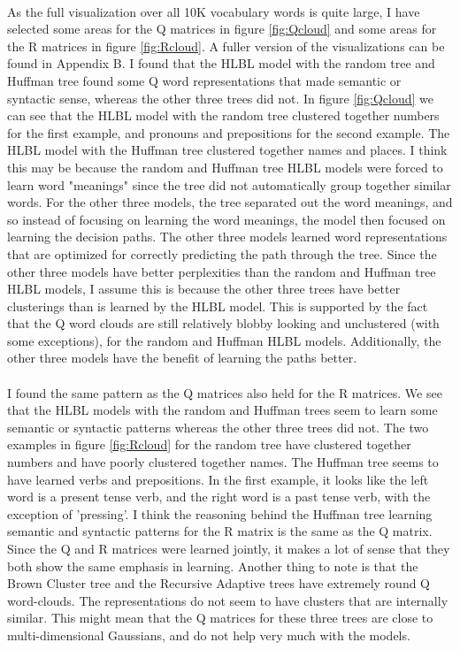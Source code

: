 \documentclass[12pt]{ociamthesis}  %
\begin{document}
\paragraph{}
As the full visualization over all 10K vocabulary words is quite large, I have selected some areas for the Q matrices in figure \ref{fig:Qcloud} and some areas for the R matrices in figure \ref{fig:Rcloud}. A fuller version of the visualizations can be found in Appendix B. I found that the HLBL model with the random tree and Huffman tree found some Q word representations that made semantic or syntactic sense, whereas the other three trees did not. In figure \ref{fig:Qcloud} we can see that the HLBL model with the random tree clustered together numbers for the first example, and pronouns and prepositions for the second example. The HLBL model with the Huffman tree clustered together names and places. I think this may be because the random and Huffman tree HLBL models were forced to learn word "meanings" since the tree did not automatically group together similar words. For the other three models, the tree separated out the word meanings, and so instead of focusing on learning the word meanings, the model then focused on learning the decision paths. The other three models learned word representations that are optimized for correctly predicting the path through the tree. Since the other three models have better perplexities than the random and Huffman tree HLBL models, I assume this is because the other three trees have better clusterings than is learned by the HLBL model. This is supported by the fact that the Q word clouds are still relatively blobby looking and unclustered (with some exceptions), for the random and Huffman HLBL models. Additionally, the other three models have the benefit of learning the paths better.
\paragraph{}
I found the same pattern as the Q matrices also held for the R matrices. We see that the HLBL models with the random and Huffman trees seem to learn some semantic or syntactic patterns whereas the other three trees did not. The two examples in figure \ref{fig:Rcloud} for the random tree have clustered together numbers and have poorly clustered together names. The Huffman tree seems to have learned verbs and prepositions. In the first example, it looks like the left word is a present tense verb, and the right word is a past tense verb, with the exception of 'pressing'. I think the reasoning behind the Huffman tree learning semantic and syntactic patterns for the R matrix is the same as the Q matrix. Since the Q and R matrices were learned jointly, it makes a lot of sense that they both show the same emphasis in learning. Another thing to note is that the Brown Cluster tree and the Recursive Adaptive trees have extremely round Q word-clouds. The representations do not seem to have clusters that are internally similar. This might mean that the Q matrices for these three trees are close to multi-dimensional Gaussians, and do not help very much with the models.
\end{document}
